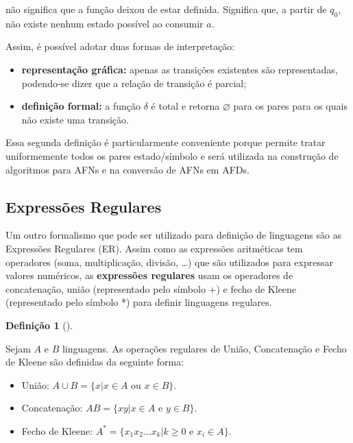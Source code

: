 \documentclass[
  brazilian,
  letterpaper,
]{book}
\providecommand{\tightlist}{%
  \setlength{\itemsep}{0pt}\setlength{\parskip}{0pt}}
\theoremstyle{plain}
\theoremstyle{definition}
\newtheorem{definition}{Definição}[chapter]
\theoremstyle{remark}
\begin{document}
não significa que a função deixou de estar definida. Significa que, a
partir de \(q_0\), não existe nenhum estado possível ao consumir \(a\).

Assim, é possível adotar duas formas de interpretação:

\begin{itemize}
\tightlist
\item
  \textbf{representação gráfica:} apenas as transições existentes são
  representadas, podendo-se dizer que a relação de transição é parcial;
\item
  \textbf{definição formal:} a função \(\delta\) é total e retorna
  \(\varnothing\) para os pares para os quais não existe uma transição.
\end{itemize}

Essa segunda definição é particularmente conveniente porque permite
tratar uniformemente todos os pares estado/símbolo e será utilizada na
construção de algoritmos para AFNs e na conversão de AFNs em AFDs.

\subsection{Expressões Regulares}\label{expressuxf5es-regulares}

Um outro formalismo que pode ser utilizado para definição de linguagens
são as Expressões Regulares (ER). Assim como as expressões aritméticas
tem operadores (soma, multiplicação, divisão, \ldots) que são utilizados
para expressar valores numéricos, as \textbf{expressões regulares} usam
os operadores de concatenação, união (representado pelo símbolo +) e
fecho de Kleene (representado pelo símbolo *) para definir linguagens
regulares.

\begin{definition}[]\protect\hypertarget{def-operacoes-regulares}{}\label{def-operacoes-regulares}

Sejam \(A\) e \(B\) linguagens. As operações regulares de União,
Concatenação e Fecho de Kleene são definidas da seguinte forma:

\begin{itemize}
\item
  União: \(A \cup B = \{x | x \in A\) ou \(x \in B\}\).
\item
  Concatenação: \(AB = \{xy | x \in A\) e \(y \in B\}\).
\item
  Fecho de Kleene: \(A^*= \{x_1x_2...x_k | k \geq 0\) e \(x_i \in A\}\).
\end{itemize}

\end{definition}
\end{document}

